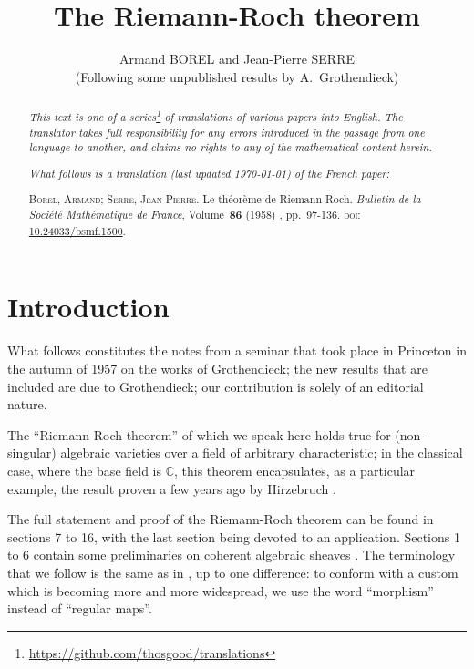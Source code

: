 \documentclass{article}
\theoremstyle{plain}
\theoremstyle{definition}
\newcommand{\oldpage}[1]{\marginpar{\footnotesize$\Big\vert$ \textit{p.~#1}}}
\begin{document}
\renewcommand{\abstractname}{Translator's note.}

\title{The Riemann-Roch theorem}
\author{Armand BOREL and Jean-Pierre SERRE\\(Following some unpublished results by A.~Grothendieck)}
\date{}
\maketitle

\begin{abstract}
  \renewcommand*{\thefootnote}{\fnsymbol{footnote}}
  \emph{This text is one of a series\footnote{\url{https://github.com/thosgood/translations}} of translations of various papers into English.}
  \emph{The translator takes full responsibility for any errors introduced in the passage from one language to another, and claims no rights to any of the mathematical content herein.}
  
  \emph{What follows is a translation (last updated \today) of the French paper:}

  \medskip\noindent
  \textsc{Borel, Armand}; \textsc{Serre, Jean-Pierre}. Le th\'{e}or\`{e}me de Riemann-Roch. \emph{Bulletin de la Soci\'{e}t\'{e} Math\'{e}matique de France}, Volume~\textbf{86} (1958) , pp.~97-136. \textsc{doi}: \href{https://www.doi.org/10.24033/bsmf.1500}{10.24033/bsmf.1500}.
\end{abstract}

\tableofcontents



\section*{Introduction}

\oldpage{97}
What follows constitutes the notes from a seminar that took place in Princeton in the autumn of 1957 on the works of Grothendieck;
the new results that are included are due to Grothendieck;
our contribution is solely of an editorial nature.

The ``Riemann-Roch theorem'' of which we speak here holds true for (non-singular) algebraic varieties over a field of arbitrary characteristic;
in the classical case, where the base field is $\mathbb{C}$, this theorem encapsulates, as a particular example, the result proven a few years ago by Hirzebruch \cite{9}.

The full statement and proof of the Riemann-Roch theorem can be found in sections 7 to 16, with the last section being devoted to an application.
Sections 1 to 6 contain some preliminaries on coherent algebraic sheaves \cite{12}.
The terminology that we follow is the same as in \cite{12}, up to one difference: to conform with a custom which is becoming more and more widespread, we use the word ``morphism'' instead of ``regular maps''.
\end{document}
